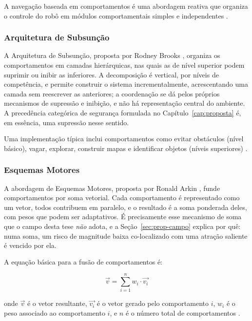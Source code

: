 A navegação baseada em comportamentos é uma abordagem reativa que organiza o controle do robô em módulos comportamentais simples e independentes \cite{Arkin1998, Brooks1986}.

\subsubsection{Arquitetura de Subsunção}

A Arquitetura de Subsunção, proposta por Rodney Brooks \cite{Brooks1986}, organiza os
comportamentos em camadas hierárquicas, nas quais as de nível superior podem suprimir ou
inibir as inferiores. A decomposição é vertical, por níveis de competência, e permite
construir o sistema incrementalmente, acrescentando uma camada sem reescrever as
anteriores; a coordenação se dá pelos próprios mecanismos de supressão e inibição, e não
há representação central do ambiente. A precedência categórica de segurança formulada no
Capítulo~\ref{cap:proposta} é, em essência, uma supressão nesse sentido.

Uma implementação típica inclui comportamentos como evitar obstáculos (nível básico), vagar, explorar, construir mapas e identificar objetos (níveis superiores) \cite{Brooks1986}.

\subsubsection{Esquemas Motores}

A abordagem de Esquemas Motores, proposta por Ronald Arkin \cite{Arkin1989}, funde
comportamentos por soma vetorial. Cada comportamento é representado como um vetor, todos
contribuem em paralelo, e o resultado é a soma ponderada deles, com pesos que podem ser
adaptativos. É precisamente esse mecanismo de soma que o campo desta tese \emph{não}
adota, e a Seção~\ref{sec:prop-campo} explica por quê: numa soma, um risco de magnitude
baixa co-localizado com uma atração saliente é vencido por ela.

A equação básica para a fusão de comportamentos é:

\begin{equation}
\vec{v} = \sum_{i=1}^{n} w_i \cdot \vec{v_i}
\end{equation}

onde $\vec{v}$ é o vetor resultante, $\vec{v_i}$ é o vetor gerado pelo comportamento $i$, $w_i$ é o peso associado ao comportamento $i$, e $n$ é o número total de comportamentos \cite{Arkin1998}.

